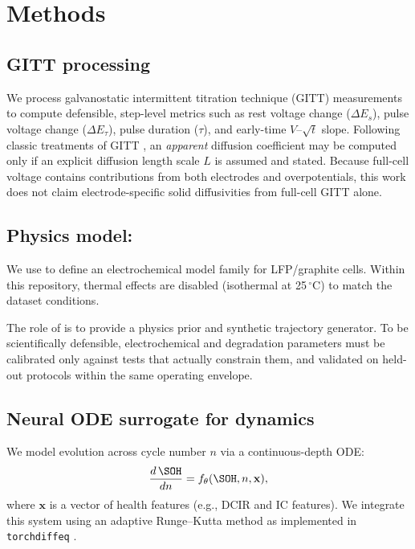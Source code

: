 \section{Methods}
\label{sec:methods}

\subsection{GITT processing}
We process galvanostatic intermittent titration technique (GITT) measurements
to compute defensible, step-level metrics such as rest voltage change
($\Delta E_s$), pulse voltage change ($\Delta E_\tau$), pulse duration ($\tau$),
and early-time $V$--$\sqrt{t}$ slope. Following classic treatments of GITT
\citep{WeppnerHuggins1977GITT}, an \emph{apparent} diffusion coefficient may be
computed only if an explicit diffusion length scale $L$ is assumed and stated.
Because full-cell voltage contains contributions from both electrodes and
overpotentials, this work does not claim electrode-specific solid diffusivities
from full-cell GITT alone.

\subsection{Physics model: \pybamm}
We use \pybamm \citep{Sulzer2021PyBaMM} to define an electrochemical model
family for LFP/graphite cells. Within this repository, thermal effects are
disabled (isothermal at 25\,$^\circ$C) to match the dataset conditions.

The role of \pybamm is to provide a physics prior and synthetic trajectory
generator. To be scientifically defensible, electrochemical and degradation
parameters must be calibrated only against tests that actually constrain them,
and validated on held-out protocols within the same operating envelope.

\subsection{Neural ODE surrogate for \SOH dynamics}
We model \SOH evolution across cycle number $n$ via a continuous-depth ODE:
\begin{equation}
  \frac{d\,\SOH}{dn} = f_\theta(\SOH, n, \mathbf{x}),
\end{equation}
where $\mathbf{x}$ is a vector of health features (e.g., DCIR and IC features).
We integrate this system using an adaptive Runge--Kutta method as implemented in
\texttt{torchdiffeq} \citep{Chen2018NeuralODE}.


